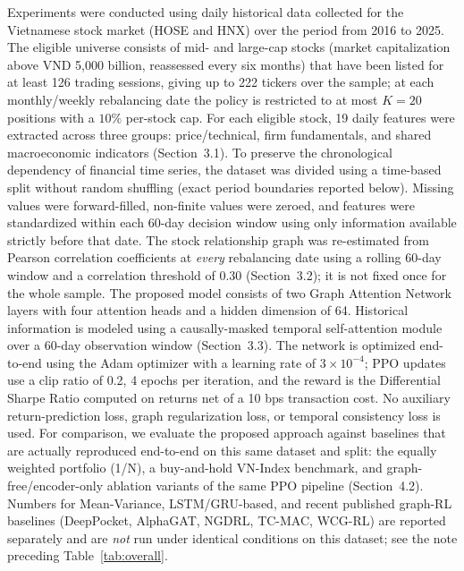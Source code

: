 \documentclass[runningheads]{llncs}
\begin{document}
Experiments were conducted using daily historical data collected for the Vietnamese stock market (HOSE and HNX) over the period from 2016 to 2025. The eligible universe consists of mid- and large-cap stocks (market capitalization above VND 5{,}000 billion, reassessed every six months) that have been listed for at least 126 trading sessions, giving up to 222 tickers over the sample; at each monthly/weekly rebalancing date the policy is restricted to at most $K=20$ positions with a $10\%$ per-stock cap. For each eligible stock, 19 daily features were extracted across three groups: price/technical, firm fundamentals, and shared macroeconomic indicators (Section~3.1). To preserve the chronological dependency of financial time series, the dataset was divided using a time-based split without random shuffling (exact period boundaries reported below). Missing values were forward-filled, non-finite values were zeroed, and features were standardized within each 60-day decision window using only information available strictly before that date. The stock relationship graph was re-estimated from Pearson correlation coefficients at \emph{every} rebalancing date using a rolling 60-day window and a correlation threshold of 0.30 (Section~3.2); it is not fixed once for the whole sample. The proposed model consists of two Graph Attention Network layers with four attention heads and a hidden dimension of 64. Historical information is modeled using a causally-masked temporal self-attention module over a 60-day observation window (Section~3.3). The network is optimized end-to-end using the Adam optimizer with a learning rate of $3\times10^{-4}$; PPO updates use a clip ratio of 0.2, 4 epochs per iteration, and the reward is the Differential Sharpe Ratio computed on returns net of a 10 bps transaction cost. No auxiliary return-prediction loss, graph regularization loss, or temporal consistency loss is used. For comparison, we evaluate the proposed approach against baselines that are actually reproduced end-to-end on this same dataset and split: the equally weighted portfolio (1/N), a buy-and-hold VN-Index benchmark, and graph-free/encoder-only ablation variants of the same PPO pipeline (Section~4.2). Numbers for Mean-Variance, LSTM/GRU-based, and recent published graph-RL baselines (DeepPocket, AlphaGAT, NGDRL, TC-MAC, WCG-RL) are reported separately and are \emph{not} run under identical conditions on this dataset; see the note preceding Table~\ref{tab:overall}.
\end{document}
